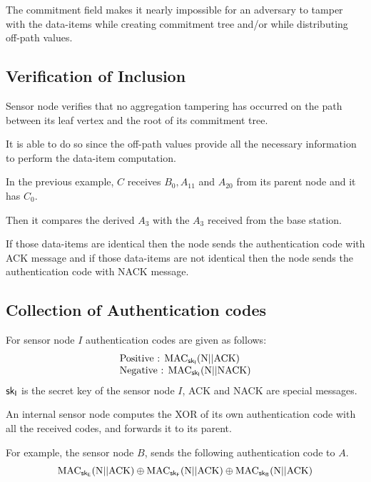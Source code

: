 \documentclass[%
  slidesonly,%
  semlayer%
  ]{seminar}                                  %
\newcommand{\sk}{\sf{sk}}
\begin{document}
\begin{slide}
        The commitment field makes it nearly impossible for an adversary to tamper with the data-items while creating commitment tree and/or while distributing off-path values.
        \vfill
        \clearpage

    \subsection*{Verification of Inclusion}
        \vfill
        Sensor node verifies that no aggregation tampering has occurred on the path between its leaf vertex and the root of its commitment tree.

        It is able to do so since the off-path values provide all the necessary information to perform the data-item computation.

        In the previous example, $C$ receives $B_{0}, A_{11}$ and $ A_{20}$ from its parent node and it has $C_{0}$.
 
        Then it compares the derived $A_{3}$ with the $A_{3}$ received from the base station.

        If those data-items are identical then the node sends the authentication code with ACK message and if those data-items are not identical then the node sends the authentication code with NACK message.
        \vfill
        \clearpage

    \subsection*{Collection of Authentication codes}
        \vfill
        For sensor node $I$ authentication codes are given as follows:
        \begin{equation}
          \begin{array}{l}
            \mbox{Positive : } \mbox{MAC}_{\sk_{I}}(\mbox{N} || \mbox{ACK})\\
            \mbox{Negative : } \mbox{MAC}_{\sk_{I}}(\mbox{N} || \mbox{NACK})
          \end{array}
        \end{equation}        
        $\sk_{I}$ is the secret key of the sensor node $I$, ACK and NACK are special messages.

        An internal sensor node computes the XOR of its own authentication code with all the received codes, and forwards it to its parent.
 
        For example, the sensor node $B$, sends the following authentication code to $A$.
        \begin{equation*}
          \mbox{MAC}_{\sk_{E}}(\mbox{N}||\mbox{ACK}) \oplus \mbox{MAC}_{\sk_{F}}(\mbox{N}||\mbox{ACK}) \oplus \mbox{MAC}_{\sk_{B}}(\mbox{N}||\mbox{ACK})
        \end{equation*}
        \vfill
        \clearpage


\end{slide}
\end{document}
